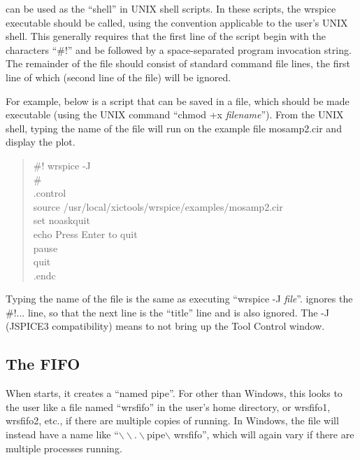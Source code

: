 {\WRspice} can be used as the ``shell'' in UNIX shell scripts.  In
these scripts, the {\vt wrspice} executable should be called, using
the convention applicable to the user's UNIX shell.  This generally
requires that the first line of the script begin with the characters
``{\vt \#!}'' and be followed by a space-separated program invocation
string.  The remainder of the file should consist of standard
{\WRspice} command file lines, the first line of which (second line of
the file) will be ignored.

For example, below is a script that can be saved in a file, which
should be made executable (using the UNIX command ``{\vt chmod +x {\it
filename\/}}'').  From the UNIX shell, typing the name of the file
will run {\WRspice} on the example file {\vt mosamp2.cir} and display
the plot.

\begin{quote}\vt
    \#! wrspice -J\\
    \#\\
    .control\\
    source /usr/local/xictools/wrspice/examples/mosamp2.cir\\
    set noaskquit\\
    echo Press Enter to quit\\
    pause\\
    quit\\
    .endc\\
\end{quote}

Typing the name of the file is the same as executing ``{\vt wrspice
-J} {\it file}''.  {\WRspice} ignores the {\vt \#!...} line, so that
the next line is the ``title'' line and is also ignored.  The {\vt -J}
(JSPICE3 compatibility) means to not bring up the {\cb Tool Control}
window.


\subsection{The FIFO}
\label{fifo}


When {\WRspice} starts, it creates a ``named pipe''.  For other than
Windows, this looks to the user like a file named ``{\vt wrsfifo}'' in
the user's home directory, or {\vt wrsfifo1}, {\vt wrsfifo2}, etc., if
there are multiple copies of {\WRspice} running.  In Windows, the file
will instead have a name like
``${\backslash}{\backslash}.{\backslash}${\vt pipe}${\backslash}${\vt
wrsfifo}'', which will again vary if there are multiple {\WRspice}
processes running.

